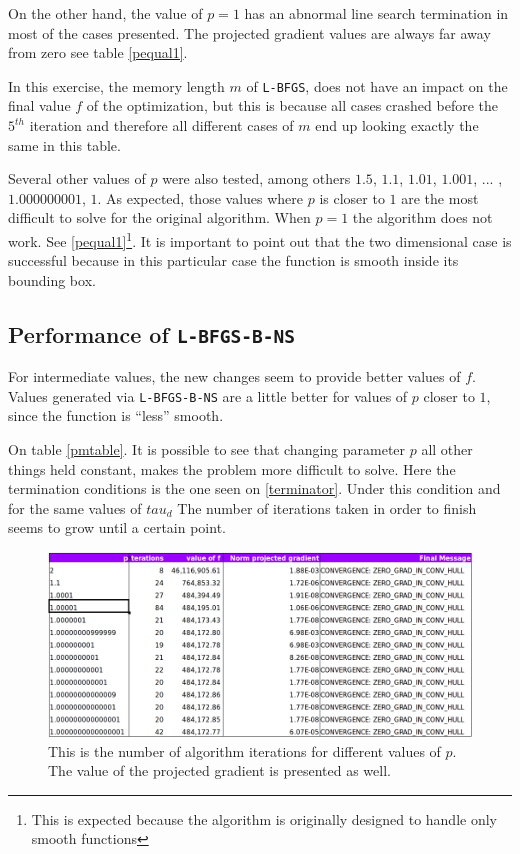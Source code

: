 On the other hand, the value of $p = 1$ has an abnormal line search termination in most of the cases presented. The projected gradient values are always far away from zero see table \eqref{pequal1}. 

In this exercise, the memory length $m$ of \texttt{L-BFGS}, does not have an impact on the final value $f$ of the optimization, but this is because all cases crashed before the $5^{th}$ iteration and therefore all different cases of $m$ end up looking exactly the same in this table.

Several other values of $p$ were also tested, among others $1.5$, $1.1$, $1.01$, $1.001$, ... , $1.000000001$, $1$. As expected, those values where $p$ is closer to $1$ are the most difficult to solve for the original algorithm. When $p=1$ the algorithm does not work. See \eqref{pequal1}\footnote{This is expected because the algorithm is originally designed to handle only smooth functions}. It is important to point out that the two dimensional case is successful because in this particular case the function is smooth inside its bounding box.

\subsection{Performance of \texttt{L-BFGS-B-NS}}

For intermediate values, the new changes seem to provide better values of $f$. Values generated via \texttt{L-BFGS-B-NS} are a little better for values of $p$ closer to $1$, since the function is ``less'' smooth.

On table \eqref{pmtable}. It is possible to see that changing parameter $p$ all other things held constant, makes the problem more difficult to solve. Here the termination conditions is the one seen on \eqref{terminator}. Under this condition and for the same values of $tau_d$ The number of iterations taken in order to finish seems to grow until a certain point. 

\begin{figure}
\begin{center}
\includegraphics[scale=0.40]{Figures/Nevaluations.png}
\caption[Number of function evaluations for different values of $p$ and $m$ in the solution of Modified Rosenbrock]{This is the number of algorithm iterations for different values of $p$. The value of the projected gradient is presented as well.}
\label{pmtable}
\end{center}
\end{figure}

